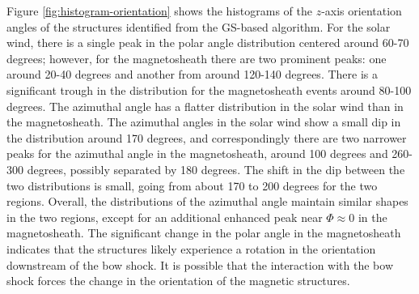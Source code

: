 
Figure \ref{fig:histogram-orientation} shows the histograms of the $z$-axis orientation angles of the structures identified from the GS-based algorithm. For the solar wind, there is a single peak in the polar angle distribution centered around 60-70 degrees; however, for the magnetosheath there are two prominent peaks: one around 20-40 degrees and another from around 120-140 degrees. There is a significant trough in the distribution for the magnetosheath events around 80-100 degrees. The azimuthal angle has a flatter distribution in the solar wind than in the magnetosheath. The azimuthal angles in the solar wind show a small dip in the distribution around 170 degrees, and correspondingly there are two narrower peaks for the azimuthal angle in the magnetosheath, around 100 degrees and 260-300 degrees, possibly separated by 180 degrees. The shift in the dip between the two distributions is small, going from about 170 to 200 degrees for the two regions. Overall, the distributions of the azimuthal angle maintain similar shapes in the two regions, except for an additional enhanced peak near $\Phi\approx 0$ in the magnetosheath. The significant change in the polar angle in the magnetosheath indicates that the structures likely experience a rotation in the orientation downstream of the bow shock. It is possible that the interaction with the bow shock forces the change in the orientation of the magnetic structures.

